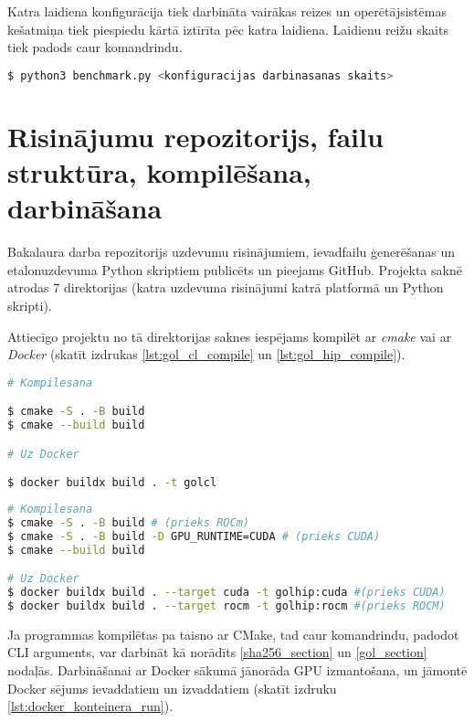 Katra laidiena konfigurācija tiek darbināta vairākas reizes un operētājsistēmas
kešatmiņa tiek piespiedu kārtā iztīrīta pēc katra laidiena. Laidienu reižu
skaits tiek padods caur komandrindu.


\begin{lstlisting}[caption={Etalonuzdevumu darbināšanas Python skripta darbināšana},
    label=lst:bench_cli, language=bash]
$ python3 benchmark.py <konfiguracijas darbinasanas skaits>
\end{lstlisting}


\section{Risinājumu repozitorijs, failu struktūra, kompilēšana, darbināšana}
Bakalaura darba repozitorijs uzdevumu risinājumiem,
ievadfailu ģenerēšanas un etalonuzdevuma Python skriptiem publicēts un pieejams
GitHub.\cite{bak_github_repo} Projekta saknē atrodas 7 direktorijas (katra uzdevuma
risinājumi katrā platformā un Python skripti).

Attiecīgo projektu no tā direktorijas saknes iespējams kompilēt ar \textit{cmake}
vai ar \textit{Docker} (skatīt izdrukas \ref{lst:gol_cl_compile} un \ref{lst:gol_hip_compile}).

\begin{lstlisting}[caption={OpenCL un CUDA risinājumu kompilēšana},
    label=lst:gol_cl_compile, language=bash]
# Kompilesana

$ cmake -S . -B build
$ cmake --build build

# Uz Docker

$ docker buildx build . -t golcl
\end{lstlisting}

\begin{lstlisting}[caption={ROCm HIP risinājumu kompilēšana}, label=lst:gol_hip_compile, language=bash]
# Kompilesana 
$ cmake -S . -B build # (prieks ROCm)
$ cmake -S . -B build -D GPU_RUNTIME=CUDA # (prieks CUDA)
$ cmake --build build

# Uz Docker
$ docker buildx build . --target cuda -t golhip:cuda #(prieks CUDA)
$ docker buildx build . --target rocm -t golhip:rocm #(prieks ROCM)
\end{lstlisting}


Ja programmas kompilētas pa taisno ar CMake, tad caur komandrindu, padodot CLI
arguments, var darbināt kā norādīts \ref{sha256_section} un \ref{gol_section}
nodaļās. Darbināšanai ar Docker sākumā jānorāda  GPU izmantošana, un jāmontē
Docker sējums ievaddatiem un izvaddatiem (skatīt izdruku
\ref{lst:docker_konteinera_run}).

